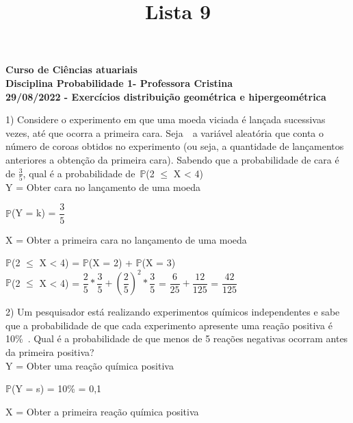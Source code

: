\documentclass[12pt,a4paper,draft]{article}
\title{Lista 9}
\date{}
\begin{document}
	\maketitle
	\begin{center}
		\textbf{Curso de Ciências atuariais}\\
		\textbf{Disciplina Probabilidade 1- Professora Cristina}\\
		\textbf{29/08/2022 - Exercícios distribuição geométrica e hipergeométrica}
	\end{center}
	1) Considere o experimento em que uma moeda viciada é lançada sucessivas vezes, até que ocorra a primeira cara. Seja  a variável aleatória que conta o número de coroas obtidos no experimento (ou seja, a quantidade de lançamentos anteriores a obtenção da primeira cara). Sabendo que a probabilidade de cara é de $\frac{3}{5}$, qual é a probabilidade de $\mathbb{P}$(2 $\leq$ X < 4)
	\vspace{0.5cm}\\
	Y = Obter cara no lançamento de uma moeda
	\begin{center}
		\vspace{0.5cm}
		$\mathbb{P}$(Y = k) = $\dfrac{3}{5}$
	\end{center}
	\vspace{1cm}
	X = Obter a primeira cara no lançamento de uma  moeda
	\begin{center}
		\vspace{0.5cm}
		$\mathbb{P}$(2 $\leq$ X < 4) = $\mathbb{P}$(X = 2) + $\mathbb{P}$(X = 3)
		\vspace{0.5cm}\\
		$\mathbb{P}$(2 $\leq$ X < 4) = $\dfrac{2}{5} * \dfrac{3}{5} + \left(\dfrac{2}{5}\right)^2 * \dfrac{3}{5}$ = $\dfrac{6}{25} + \dfrac{12}{125}$ = $\dfrac{42}{125}$
	\end{center}
	\vspace{1cm}
	2) Um pesquisador está realizando experimentos químicos independentes e sabe que a probabilidade de que cada experimento apresente uma reação positiva é 10\% . Qual é a probabilidade de que menos de 5 reações negativas ocorram antes da primeira positiva?
	\vspace{0.5cm}\\
	Y = Obter uma reação química positiva
	\begin{center}
		\vspace{0.5cm}
		$\mathbb{P}$(Y = s) = 10\% = 0,1
	\end{center}
	\vspace{1cm}
	X = Obter a primeira reação química positiva
\end{document}
